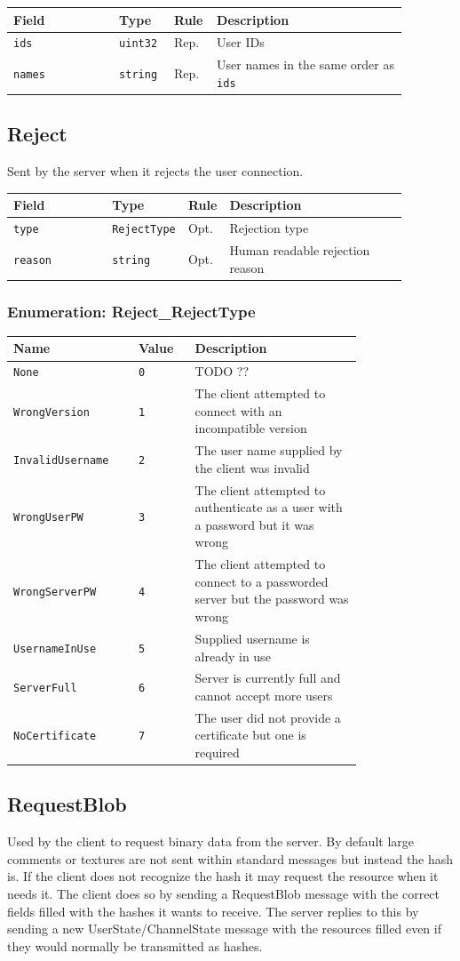 \documentclass[11pt]{article} %
\newenvironment{mumbleMessageEx}
{%
	\small
	\renewcommand\arraystretch{1.5}
	\begin{tabular}{p{0.25\linewidth}p{0.13\linewidth}p{0.05\linewidth}p{0.45\linewidth}}
	Field & Type & Rule & Description \\
	\hline
}
{%
	\end{tabular}
	\renewcommand\arraystretch{1.0}
}
\newcommand{\mumbleMessageExItem}[4]{ \texttt{#1} & \texttt{#2} & #3 & #4 \\ }
\newenvironment{mumbleEnum}
{%
	\small
	\renewcommand\arraystretch{1.5}
	\begin{tabular}{p{0.25\linewidth}p{0.13\linewidth}p{0.4\linewidth}}
	Name & Value & Description \\
	\hline
}
{%
	\end{tabular}
	\renewcommand\arraystretch{1.0}
}
\newcommand{\mumbleEnumItem}[3]{ \texttt{#1} & \texttt{#2} & #3 \\ }
\begin{document}
\begin{mumbleMessageEx}
\mumbleMessageExItem{ids}{uint32}{Rep.}{User IDs}
\mumbleMessageExItem{names}{string}{Rep.}{User names in the same order as \texttt{ids}}
\end{mumbleMessageEx}

\subsection{Reject}
\label{msg:reject}

Sent by the server when it rejects the user connection.

\begin{mumbleMessageEx}
\mumbleMessageExItem{type}{RejectType}{Opt.}{Rejection type}
\mumbleMessageExItem{reason}{string}{Opt.}{Human readable rejection reason}
\end{mumbleMessageEx}

\subsubsection{Enumeration: Reject\_RejectType}
\label{msg:reject:rejectType}

\begin{mumbleEnum}
\mumbleEnumItem{None}{0}{TODO ??}
\mumbleEnumItem{WrongVersion}{1}{The client attempted to connect with an incompatible version}
\mumbleEnumItem{InvalidUsername}{2}{The user name supplied by the client was invalid}
\mumbleEnumItem{WrongUserPW}{3}{The client attempted to authenticate as a user with a password but it was wrong}
\mumbleEnumItem{WrongServerPW}{4}{The client attempted to connect to a passworded server but the password was wrong}
\mumbleEnumItem{UsernameInUse}{5}{Supplied username is already in use}
\mumbleEnumItem{ServerFull}{6}{Server is currently full and cannot accept more users}
\mumbleEnumItem{NoCertificate}{7}{The user did not provide a certificate but one is required}
\end{mumbleEnum}

\subsection{RequestBlob}
\label{msg:requestBlob}

Used by the client to request binary data from the server. By default large comments or textures are not sent within standard messages but instead the hash is. If the client does not recognize the hash it may request the resource when it needs it. The client does so by sending a RequestBlob message with the correct fields filled with the hashes it wants to receive. The server replies to this by sending a new UserState/ChannelState message with the resources filled even if they would normally be transmitted as hashes.
\end{document}
